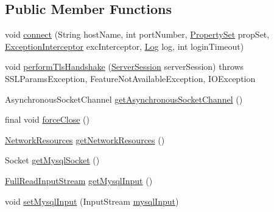 \subsection*{Public Member Functions}
\begin{DoxyCompactItemize}
\item 
void \mbox{\hyperlink{classcom_1_1mysql_1_1cj_1_1protocol_1_1x_1_1_x_async_socket_connection_a6b2b3e14475625ac633ea3258d4eeb08}{connect}} (String host\+Name, int port\+Number, \mbox{\hyperlink{interfacecom_1_1mysql_1_1cj_1_1conf_1_1_property_set}{Property\+Set}} prop\+Set, \mbox{\hyperlink{interfacecom_1_1mysql_1_1cj_1_1exceptions_1_1_exception_interceptor}{Exception\+Interceptor}} exc\+Interceptor, \mbox{\hyperlink{interfacecom_1_1mysql_1_1cj_1_1log_1_1_log}{Log}} log, int login\+Timeout)
\item 
void \mbox{\hyperlink{classcom_1_1mysql_1_1cj_1_1protocol_1_1x_1_1_x_async_socket_connection_a3e9822eb06f30e59addd9965056237c1}{perform\+Tls\+Handshake}} (\mbox{\hyperlink{interfacecom_1_1mysql_1_1cj_1_1protocol_1_1_server_session}{Server\+Session}} server\+Session)  throws S\+S\+L\+Params\+Exception, Feature\+Not\+Available\+Exception, I\+O\+Exception 
\item 
Asynchronous\+Socket\+Channel \mbox{\hyperlink{classcom_1_1mysql_1_1cj_1_1protocol_1_1x_1_1_x_async_socket_connection_a1c70e8bf34ff9c3f1b2b0007260f10e7}{get\+Asynchronous\+Socket\+Channel}} ()
\item 
final void \mbox{\hyperlink{classcom_1_1mysql_1_1cj_1_1protocol_1_1x_1_1_x_async_socket_connection_ac282682b46d2807beef590caebaa5b71}{force\+Close}} ()
\item 
\mbox{\hyperlink{classcom_1_1mysql_1_1cj_1_1protocol_1_1_network_resources}{Network\+Resources}} \mbox{\hyperlink{classcom_1_1mysql_1_1cj_1_1protocol_1_1x_1_1_x_async_socket_connection_a99b18cbdd06e398d4c1e25ea6172e1c2}{get\+Network\+Resources}} ()
\item 
Socket \mbox{\hyperlink{classcom_1_1mysql_1_1cj_1_1protocol_1_1x_1_1_x_async_socket_connection_a3d6ea580f0252b26d6385e69fe71f02c}{get\+Mysql\+Socket}} ()
\item 
\mbox{\hyperlink{classcom_1_1mysql_1_1cj_1_1protocol_1_1_full_read_input_stream}{Full\+Read\+Input\+Stream}} \mbox{\hyperlink{classcom_1_1mysql_1_1cj_1_1protocol_1_1x_1_1_x_async_socket_connection_a780fb96617a64cb758ef75681f6dc3ab}{get\+Mysql\+Input}} ()
\item 
void \mbox{\hyperlink{classcom_1_1mysql_1_1cj_1_1protocol_1_1x_1_1_x_async_socket_connection_af5b71958ccff270ccc3a24afa1b3a0af}{set\+Mysql\+Input}} (Input\+Stream \mbox{\hyperlink{classcom_1_1mysql_1_1cj_1_1protocol_1_1_abstract_socket_connection_a8e7f00881c12ca5a9424a24fa567cb85}{mysql\+Input}})

\end{DoxyCompactItemize}
